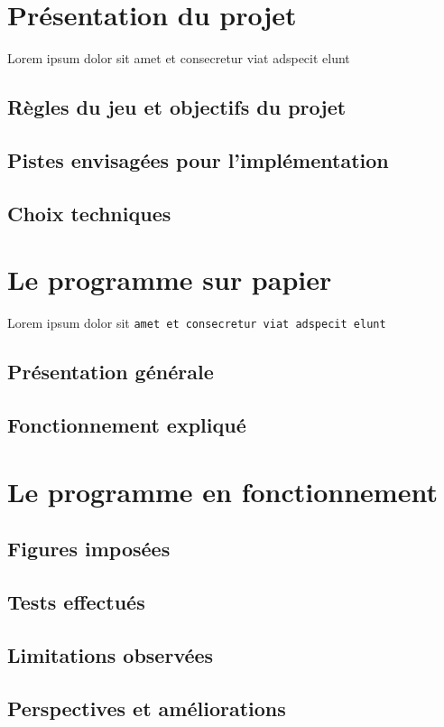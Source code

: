 \section{Présentation du projet}
   Lorem ipsum dolor sit amet et consecretur viat adspecit elunt

   \subsection{Règles du jeu et objectifs du projet}

   \subsection{Pistes envisagées pour l'implémentation}

   \subsection{Choix techniques}


\section{Le programme sur papier}
   Lorem ipsum dolor sit \tt{amet} et consecretur viat adspecit elunt

   \subsection{Présentation générale}

   \subsection{Fonctionnement expliqué}
   

\section{Le programme en fonctionnement}

   \subsection{Figures imposées}

   \subsection{Tests effectués}
   
   \subsection{Limitations observées}
   
   \subsection{Perspectives et améliorations}
